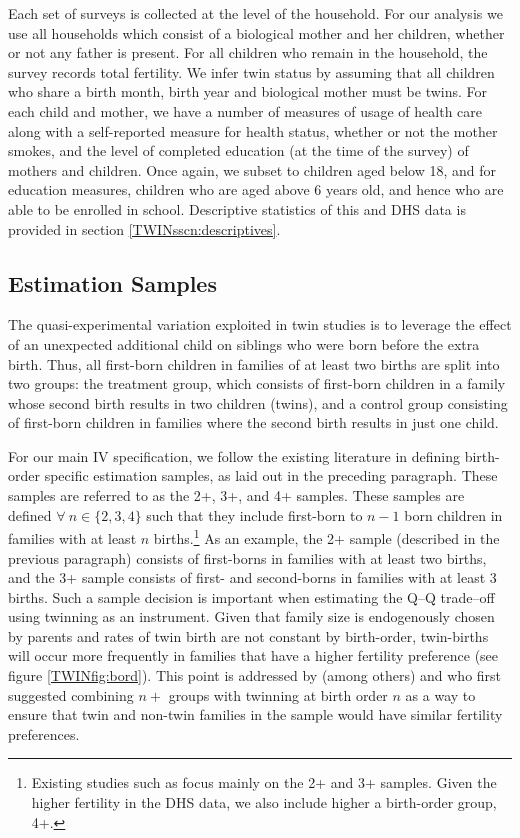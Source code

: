 \documentclass[subeqn]{article}
\begin{document}
\begin{spacing}{1.4}
Each set of surveys is collected at the level of the household.  For our 
analysis we use all households which consist of a biological mother and her 
children, whether or not any father is present.  For all children who remain in
the household, the survey records total fertility.  We infer twin status by
assuming that all children who share a birth month, birth year and biological
mother must be twins.  For each child and mother, we have a number of measures
of usage of health care along with a self-reported measure for health status, 
whether or not the mother smokes, and the level of completed education (at the 
time of the survey) of mothers and children.  Once again, we subset to children
aged below 18, and for education measures, children who are aged above 6 years
old, and hence who are able to be enrolled in school.  Descriptive statistics of
this and DHS data is provided in section \ref{TWINsscn:descriptives}.

\subsection{Estimation Samples}                    \label{TWINsscn:samples}
The quasi-experimental variation exploited in twin studies is to leverage the 
effect of an unexpected additional child on siblings who were born before the 
extra birth.  Thus, all first-born children in families of at least two births
are split into two groups: the treatment group, which consists of first-born
children in a family whose second birth results in two children (twins), and a
control group consisting of first-born children in families where the second
birth results in just one child.

For our main IV specification, we follow the existing literature in defining
birth-order specific estimation samples, as laid out in the preceding 
paragraph. These samples are referred to as the 2+, 3+, and 4+ samples. These 
samples are defined $\forall\ n \in \{2, 3, 4\}$ such that they include 
first-born to $n-1$ born children in families with at least $n$ births.\footnote{
Existing studies such as \citet{Angristetal2010} focus mainly on the 2+ and 3+ 
samples. Given the higher fertility in the DHS data, we also include higher a
birth-order group, 4+.} As an example, the 2+ sample (described in the previous
paragraph) consists of first-borns in families with at least two births, and the 
3+ sample consists of first- and second-borns in families with at least 3 births.
Such a sample decision is important when estimating the Q--Q trade--off using 
twinning as an instrument. Given that family size is endogenously chosen by 
parents and rates of twin birth are not constant by birth-order, twin-births will 
occur more frequently in families that have a higher fertility preference (see
figure \ref{TWINfig:bord}). This point is addressed by (among others) 
\citet{RosenzweigWolpin1980} and \citet{Blacketal2005} who first suggested 
combining $n+$ groups with twinning at birth order $n$ as a way to ensure that 
twin and non-twin families in the sample would have similar fertility 
preferences.


\end{spacing}
\end{document}
